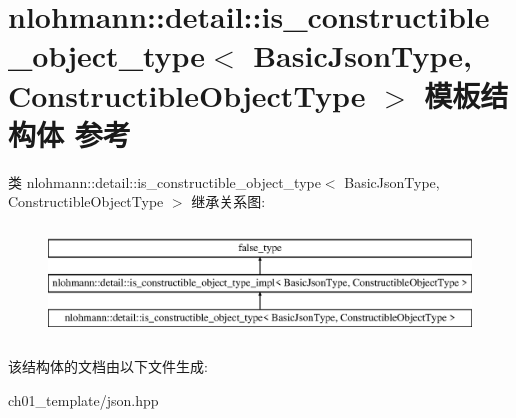 \hypertarget{structnlohmann_1_1detail_1_1is__constructible__object__type}{}\section{nlohmann\+::detail\+::is\+\_\+constructible\+\_\+object\+\_\+type$<$ Basic\+Json\+Type, Constructible\+Object\+Type $>$ 模板结构体 参考}
\label{structnlohmann_1_1detail_1_1is__constructible__object__type}
类 nlohmann\+::detail\+::is\+\_\+constructible\+\_\+object\+\_\+type$<$ Basic\+Json\+Type, Constructible\+Object\+Type $>$ 继承关系图\+:\begin{figure}[H]
\begin{center}
\leavevmode
\includegraphics[height=2.984014cm]{structnlohmann_1_1detail_1_1is__constructible__object__type}
\end{center}
\end{figure}


该结构体的文档由以下文件生成\+:\begin{DoxyCompactItemize}
\item 
ch01\+\_\+template/json.\+hpp\end{DoxyCompactItemize}
